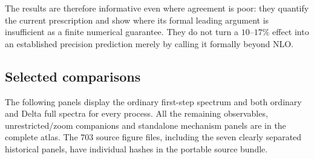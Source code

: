 The results are therefore informative even where agreement is poor:
they quantify the current prescription and show where its formal
leading argument is insufficient as a finite numerical guarantee. They
do not turn a $10$--$17\%$ effect into an established precision
prediction merely by calling it formally beyond NLO.

\subsection{Selected comparisons}
The following panels display the ordinary first-step spectrum and both
ordinary and Delta full spectra for every process. All the remaining
observables, unrestricted/zoom companions and standalone mechanism
panels are in the complete atlas. The 703 source figure files, including
the seven clearly separated historical panels, have individual hashes
in the portable source bundle.















\FloatBarrier
